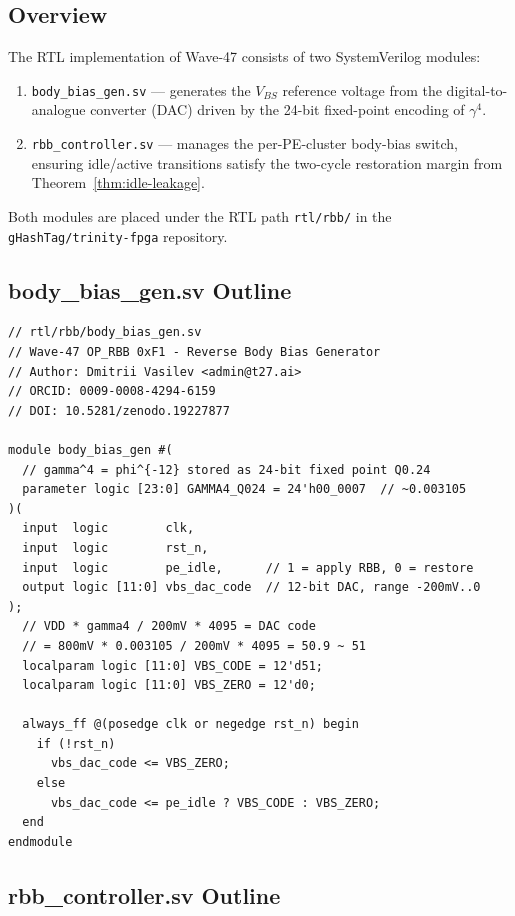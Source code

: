 \subsection{Overview}

The RTL implementation of Wave-47 consists of two SystemVerilog modules:
\begin{enumerate}
  \item \texttt{body\_bias\_gen.sv} — generates the $V_{BS}$ reference voltage
    from the digital-to-analogue converter (DAC) driven by the 24-bit
    fixed-point encoding of $\gamma^{4}$.
  \item \texttt{rbb\_controller.sv} — manages the per-PE-cluster body-bias
    switch, ensuring idle/active transitions satisfy the two-cycle
    restoration margin from Theorem~\ref{thm:idle-leakage}.
\end{enumerate}
Both modules are placed under the RTL path \texttt{rtl/rbb/} in the
\texttt{gHashTag/trinity-fpga} repository.

\subsection{body\_bias\_gen.sv Outline}

\begin{verbatim}
// rtl/rbb/body_bias_gen.sv
// Wave-47 OP_RBB 0xF1 - Reverse Body Bias Generator
// Author: Dmitrii Vasilev <admin@t27.ai>
// ORCID: 0009-0008-4294-6159
// DOI: 10.5281/zenodo.19227877

module body_bias_gen #(
  // gamma^4 = phi^{-12} stored as 24-bit fixed point Q0.24
  parameter logic [23:0] GAMMA4_Q024 = 24'h00_0007  // ~0.003105
)(
  input  logic        clk,
  input  logic        rst_n,
  input  logic        pe_idle,      // 1 = apply RBB, 0 = restore
  output logic [11:0] vbs_dac_code  // 12-bit DAC, range -200mV..0
);
  // VDD * gamma4 / 200mV * 4095 = DAC code
  // = 800mV * 0.003105 / 200mV * 4095 = 50.9 ~ 51
  localparam logic [11:0] VBS_CODE = 12'd51;
  localparam logic [11:0] VBS_ZERO = 12'd0;

  always_ff @(posedge clk or negedge rst_n) begin
    if (!rst_n)
      vbs_dac_code <= VBS_ZERO;
    else
      vbs_dac_code <= pe_idle ? VBS_CODE : VBS_ZERO;
  end
endmodule
\end{verbatim}

\subsection{rbb\_controller.sv Outline}

